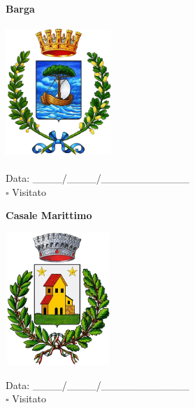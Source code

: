 \documentclass[a5paper,12pt]{article}
\begin{document}
\newpage

\noindent
\begin{minipage}[t]{0.45\textwidth}
    \begin{center}
        \textbf{Barga}
    \end{center}
    \vspace{-0.5cm} %
    \begin{center}
        \includegraphics[height= 5cm, width=4cm]{Toscana/Stemma Barga.png}
    \end{center}
    \vspace{-0.4cm} %
    \begin{flushleft}
        Data: \_\_\_\_/\_\_\_\_/\_\_\_\_\_\_\_\_\_\_\_\_ \\
        $\square$ Visitato
    \end{flushleft}
\end{minipage}
\hfill
\noindent
\begin{minipage}[t]{0.45\textwidth}
    \begin{center}
        \textbf{Casale Marittimo}
    \end{center}
    \vspace{-0.5cm} %
    \begin{center}
        \includegraphics[height= 5cm, width=4cm]{Toscana/Stemma Casale Marittimo.png}
    \end{center}
    \vspace{-0.4cm} %
    \begin{flushleft}
        Data: \_\_\_\_/\_\_\_\_/\_\_\_\_\_\_\_\_\_\_\_\_ \\
        $\square$ Visitato
    \end{flushleft}
\end{minipage}
\end{document}
